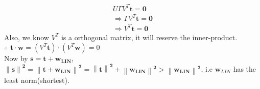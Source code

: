 \documentclass[a4paper,12pt]{article}
\begin{document}
\begin{itemize}
 \begin{align*}
 U \Gamma V^T \mathbf{t} = \mathbf{0} \\
 \Rightarrow \Gamma V^T \mathbf{t}=\mathbf{0} \\
 \Rightarrow V^T \mathbf{t}=\mathbf{0}
 \end{align*}
 Also, we know $V^T$ is a orthogonal matrix, it will reserve the inner-product.\\
 $\therefore$ $\mathbf{t \cdot w}= (V^T \mathbf{t}) \cdot (V^T \mathbf{w})=0$  \\
Now by $\mathbf{s=t+w_{LIN}}$, $\mathbf{  \left \| s \right \|^2 = \left \| t+w_{LIN} \right \|^2 = \left \| t \right \|^2 + \left \| w_{LIN} \right \|^2 > \left \| w_{LIN} \right \|^2} $, i.e $\mathbf{w}_{LIN}$ has the least norm(shortest).

\end{itemize} 


\medskip
\end{document}
